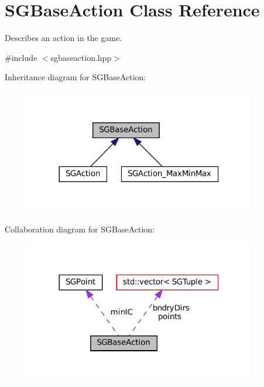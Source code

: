 \hypertarget{classSGBaseAction}{}\section{S\+G\+Base\+Action Class Reference}
\label{classSGBaseAction}


Describes an action in the game.  




{\ttfamily \#include $<$sgbaseaction.\+hpp$>$}



Inheritance diagram for S\+G\+Base\+Action\+:
\nopagebreak
\begin{figure}[H]
\begin{center}
\leavevmode
\includegraphics[width=284pt]{classSGBaseAction__inherit__graph}
\end{center}
\end{figure}


Collaboration diagram for S\+G\+Base\+Action\+:
\nopagebreak
\begin{figure}[H]
\begin{center}
\leavevmode
\includegraphics[width=284pt]{classSGBaseAction__coll__graph}
\end{center}
\end{figure}
